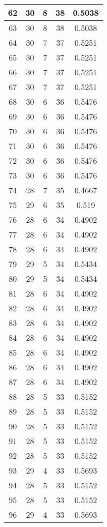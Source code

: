 \documentclass[letterpaper, 12pt]{article}
\begin{document}
\begin{longtable}{|c|c|c|c|c|}
\hline
62 & 30 & 8 & 38 & 0.5038 \\
\hline
63 & 30 & 8 & 38 & 0.5038 \\
\hline
64 & 30 & 7 & 37 & 0.5251 \\
\hline
65 & 30 & 7 & 37 & 0.5251 \\
\hline
66 & 30 & 7 & 37 & 0.5251 \\
\hline
67 & 30 & 7 & 37 & 0.5251 \\
\hline
68 & 30 & 6 & 36 & 0.5476 \\
\hline
69 & 30 & 6 & 36 & 0.5476 \\
\hline
70 & 30 & 6 & 36 & 0.5476 \\
\hline
71 & 30 & 6 & 36 & 0.5476 \\
\hline
72 & 30 & 6 & 36 & 0.5476 \\
\hline
73 & 30 & 6 & 36 & 0.5476 \\
\hline
74 & 28 & 7 & 35 & 0.4667 \\
\hline
75 & 29 & 6 & 35 & 0.519 \\
\hline
76 & 28 & 6 & 34 & 0.4902 \\
\hline
77 & 28 & 6 & 34 & 0.4902 \\
\hline
78 & 28 & 6 & 34 & 0.4902 \\
\hline
79 & 29 & 5 & 34 & 0.5434 \\
\hline
80 & 29 & 5 & 34 & 0.5434 \\
\hline
81 & 28 & 6 & 34 & 0.4902 \\
\hline
82 & 28 & 6 & 34 & 0.4902 \\
\hline
83 & 28 & 6 & 34 & 0.4902 \\
\hline
84 & 28 & 6 & 34 & 0.4902 \\
\hline
85 & 28 & 6 & 34 & 0.4902 \\
\hline
86 & 28 & 6 & 34 & 0.4902 \\
\hline
87 & 28 & 6 & 34 & 0.4902 \\
\hline
88 & 28 & 5 & 33 & 0.5152 \\
\hline
89 & 28 & 5 & 33 & 0.5152 \\
\hline
90 & 28 & 5 & 33 & 0.5152 \\
\hline
91 & 28 & 5 & 33 & 0.5152 \\
\hline
92 & 28 & 5 & 33 & 0.5152 \\
\hline
93 & 29 & 4 & 33 & 0.5693 \\
\hline
94 & 28 & 5 & 33 & 0.5152 \\
\hline
95 & 28 & 5 & 33 & 0.5152 \\
\hline
96 & 29 & 4 & 33 & 0.5693 \\

\end{longtable}
\end{document}
